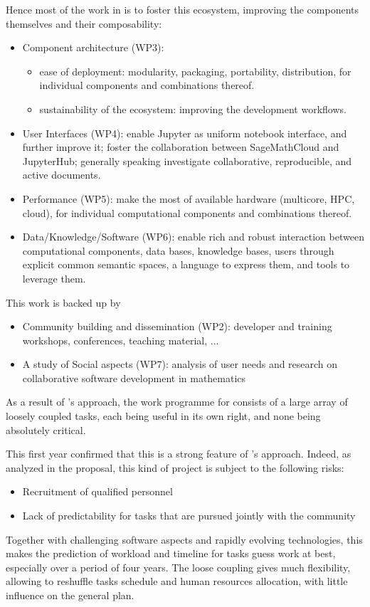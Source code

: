 \documentclass{deliverablereport}
\begin{document}
Hence most of the work in \ODK is to foster this ecosystem, improving
the components themselves and their composability:
\begin{itemize}
\item Component architecture (WP3):
  \begin{itemize}
  \item ease of deployment: modularity, packaging, portability,
    distribution, for individual components and combinations thereof.
  \item sustainability of the ecosystem: improving the development workflows.
  \end{itemize}
\item User Interfaces (WP4): enable Jupyter as uniform notebook
  interface, and further improve it; foster the collaboration between
  SageMathCloud and JupyterHub; generally speaking investigate
  collaborative, reproducible, and active documents.
\item Performance (WP5): make the most of available hardware
  (multicore, HPC, cloud), for individual computational components and
  combinations thereof.
\item Data/Knowledge/Software (WP6): enable rich and robust
  interaction between computational components, data bases, knowledge
  bases, users through explicit common semantic spaces, a language to
  express them, and tools to leverage them.
\end{itemize}
This work is backed up by
\begin{itemize}
\item Community building and dissemination (WP2): developer and
  training workshops, conferences, teaching material, ...
\item A study of Social aspects (WP7): analysis of user needs and
  research on collaborative software development in mathematics
\end{itemize}

As a result of \ODK's approach, the work programme for \ODK consists
of a large array of loosely coupled tasks, each being useful in its
own right, and none being absolutely critical.

This first year confirmed that this is a strong feature of \ODK's
approach. Indeed, as analyzed in the proposal, this kind of project is
subject to the following risks:
\begin{itemize}
\item Recruitment of qualified personnel
\item Lack of predictability for tasks that are pursued jointly with
  the community
\end{itemize}
Together with challenging software aspects and rapidly evolving
technologies, this makes the prediction of workload and timeline for
tasks guess work at best, especially over a period of four years. The
loose coupling gives much flexibility, allowing to reshuffle tasks
schedule and human resources allocation, with little influence on the
general plan.
\end{document}
